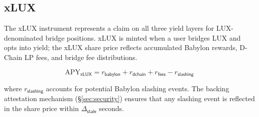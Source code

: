 \subsection{xLUX}

The xLUX instrument represents a claim on all three yield layers for LUX-denominated bridge positions. xLUX is minted when a user bridges LUX and opts into yield; the xLUX share price reflects accumulated Babylon rewards, D-Chain LP fees, and bridge fee distributions.

\begin{equation}
  \mathrm{APY}_{\mathsf{xLUX}} = r_{\mathsf{babylon}} + r_{\mathsf{dchain}} + r_{\mathsf{fees}} - r_{\mathsf{slashing}}
\end{equation}

where $r_{\mathsf{slashing}}$ accounts for potential Babylon slashing events. The backing attestation mechanism (\S\ref{sec:security}) ensures that any slashing event is reflected in the share price within $\Delta_{\mathsf{stale}}$ seconds.

